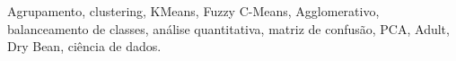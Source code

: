 Agrupamento, clustering, KMeans, Fuzzy C-Means, Agglomerativo, balanceamento de classes, análise quantitativa, matriz de confusão, PCA, Adult, Dry Bean, ciência de dados.
